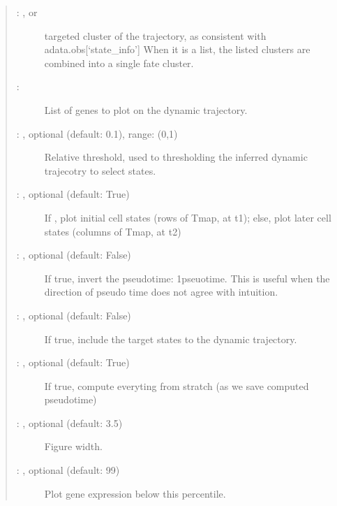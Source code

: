 \documentclass[letterpaper,10pt,english]{sphinxmanual}
\begin{document}
\begin{fulllineitems}
\begin{quote}
\begin{description}
\begin{description}
\item[{ : , or }] \leavevmode
targeted cluster of the trajectory, as consistent with adata.obs{[}‘state\_info’{]}
When it is a list, the listed clusters are combined into a single fate cluster.

\item[{ : }] \leavevmode
List of genes to plot on the dynamic trajectory.

\item[{ : , optional (default: 0.1), range: (0,1)}] \leavevmode
Relative threshold, used to thresholding the inferred dynamic trajecotry to select states.

\item[{ : , optional (default: True)}] \leavevmode
If , plot initial cell states (rows of Tmap, at t1);
else, plot later cell states (columns of Tmap, at t2)

\item[{ : , optional (default: False)}] \leavevmode
If true, invert the pseudotime: 1\sphinxhyphen{}pseuotime. This is useful when the direction
of pseudo time does not agree with intuition.

\item[{ : , optional (default: False)}] \leavevmode
If true, include the target states to the dynamic trajectory.

\item[{ : , optional (default: True)}] \leavevmode
If true, compute everyting from stratch (as we save computed pseudotime)

\item[{ : , optional (default: 3.5)}] \leavevmode
Figure width.

\item[{ : , optional (default: 99)}] \leavevmode
Plot gene expression below this percentile.


\end{description}
\end{description}
\end{quote}
\end{fulllineitems}
\end{document}
